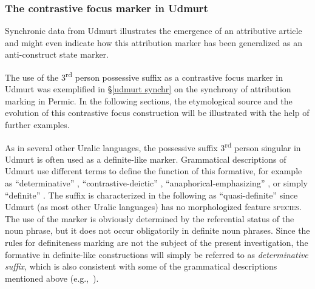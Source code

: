 \subsubsection{The contrastive focus marker in Udmurt} \label{udmurt diachr}
Synchronic data from Udmurt illustrates the emergence of an attributive article and might even indicate how this attribution marker has been generalized as an anti\hyp{}construct state marker. 

The use of the 3\textsuperscript{rd} person possessive suffix as a contrastive focus marker in Udmurt was exemplified in \S\ref{udmurt synchr} on the synchrony of attribution marking in Permic. In the following sections, the etymological source and the evolution of this contrastive focus construction will be illustrated with the help of further examples.

As in several other Uralic languages, the possessive suffix 3\textsuperscript{rd} person singular in Udmurt is often used as a definite-like marker. Grammatical descriptions of Udmurt use different terms to define the function of this formative, for example as “determinative” \citep{kelmakov-etal1999}, “contrastive-deictic” \citep{alatyrev1970}, “anaphorical-emphasizing” \citep{kiekbaev1965}, or simply “definite” \citep{winkler2001}. The suffix is characterized in the following as “quasi-definite” since Udmurt (as most other Uralic languages) has no morphologized feature \textsc{species}. The use of the marker is obviously determined by the referential status of the noun phrase, but it does not occur obligatorily in definite noun phrases. Since the rules for definiteness marking are not the subject of the present investigation, the formative in definite-like constructions will simply be referred to as \textit{determinative suffix}, which is also consistent with some of the grammatical descriptions mentioned above (e.g.,~\citealt{kelmakov-etal1999}).

